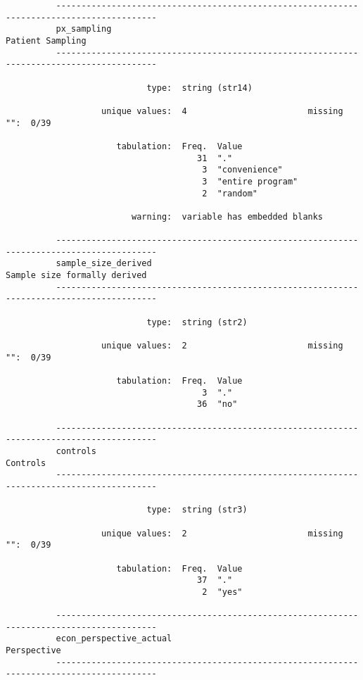 \documentclass{article}
\begin{document}
\begin{verbatim}
          ------------------------------------------------------------------------------------------
          px_sampling                                                               Patient Sampling
          ------------------------------------------------------------------------------------------
          
                            type:  string (str14)
          
                   unique values:  4                        missing "":  0/39
          
                      tabulation:  Freq.  Value
                                      31  "."
                                       3  "convenience"
                                       3  "entire program"
                                       2  "random"
          
                         warning:  variable has embedded blanks
          
          ------------------------------------------------------------------------------------------
          sample_size_derived                                           Sample size formally derived
          ------------------------------------------------------------------------------------------
          
                            type:  string (str2)
          
                   unique values:  2                        missing "":  0/39
          
                      tabulation:  Freq.  Value
                                       3  "."
                                      36  "no"
          
          ------------------------------------------------------------------------------------------
          controls                                                                          Controls
          ------------------------------------------------------------------------------------------
          
                            type:  string (str3)
          
                   unique values:  2                        missing "":  0/39
          
                      tabulation:  Freq.  Value
                                      37  "."
                                       2  "yes"
          
          ------------------------------------------------------------------------------------------
          econ_perspective_actual                                                        Perspective
          ------------------------------------------------------------------------------------------
          

\end{verbatim}
\end{document}
